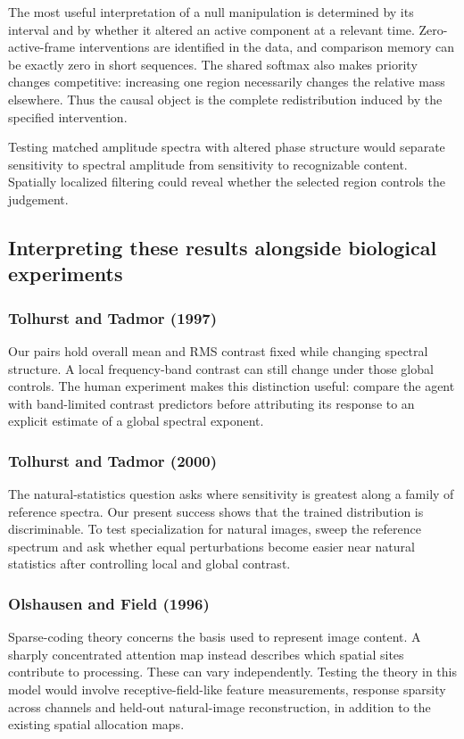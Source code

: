 \documentclass[11pt]{article}
\begin{document}
The most useful interpretation of a null manipulation is determined by its interval and by whether it altered an active component at a relevant time. Zero-active-frame interventions are identified in the data, and comparison memory can be exactly zero in short sequences. The shared softmax also makes priority changes competitive: increasing one region necessarily changes the relative mass elsewhere. Thus the causal object is the complete redistribution induced by the specified intervention.

Testing matched amplitude spectra with altered phase structure would separate sensitivity to spectral amplitude from sensitivity to recognizable content. Spatially localized filtering could reveal whether the selected region controls the judgement.

\subsection{Interpreting these results alongside biological experiments}
\subsubsection{Tolhurst and Tadmor (1997)}
Our pairs hold overall mean and RMS contrast fixed while changing spectral structure. A local frequency-band contrast can still change under those global controls. The human experiment makes this distinction useful: compare the agent with band-limited contrast predictors before attributing its response to an explicit estimate of a global spectral exponent. \cite{bio_tolhurst97}

\subsubsection{Tolhurst and Tadmor (2000)}
The natural-statistics question asks where sensitivity is greatest along a family of reference spectra. Our present success shows that the trained distribution is discriminable. To test specialization for natural images, sweep the reference spectrum and ask whether equal perturbations become easier near natural statistics after controlling local and global contrast. \cite{bio_tolhurst00}

\subsubsection{Olshausen and Field (1996)}
Sparse-coding theory concerns the basis used to represent image content. A sharply concentrated attention map instead describes which spatial sites contribute to processing. These can vary independently. Testing the theory in this model would involve receptive-field-like feature measurements, response sparsity across channels and held-out natural-image reconstruction, in addition to the existing spatial allocation maps. \cite{bio_olshausen}
\end{document}
